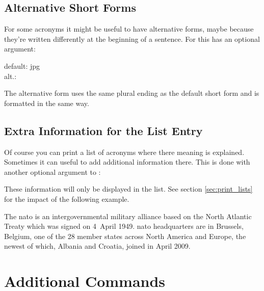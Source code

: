 \documentclass[DIV10,toc=index,toc=bib]{cnpkgdoc}
\begin{document}
\subsection{Alternative Short Forms}
For some acronyms it might be useful to have alternative forms, maybe because
they're written differently at the beginning of a sentence. For this 
has an optional argument:
\begin{beschreibung}
\end{beschreibung}
\begin{beispiel}
 default: \acs{jpg} \\
 alt.: 
\end{beispiel}
The alternative form uses the same plural ending as the default short form and
is formatted in the same way.

\subsection{Extra Information for the List Entry}
Of course you can print a list of acronyms where there meaning is explained.
Sometimes it can useful to add additional information there. This is done with
another optional argument to :
\begin{beschreibung}
\end{beschreibung}
These information will only be displayed in the list. See section \ref{sec:print_lists}
for the impact of the following example.

\begin{beispiel}
 The \ac{nato} is an intergovernmental military alliance based on the
 North Atlantic Treaty which was signed on 4~April 1949. \ac{nato}
 headquarters are in Brussels, Belgium, one of the 28 member states
 across North America and Europe, the newest of which, Albania and
 Croatia, joined in April 2009.
\end{beispiel}

\section{Additional Commands}
\end{document}
